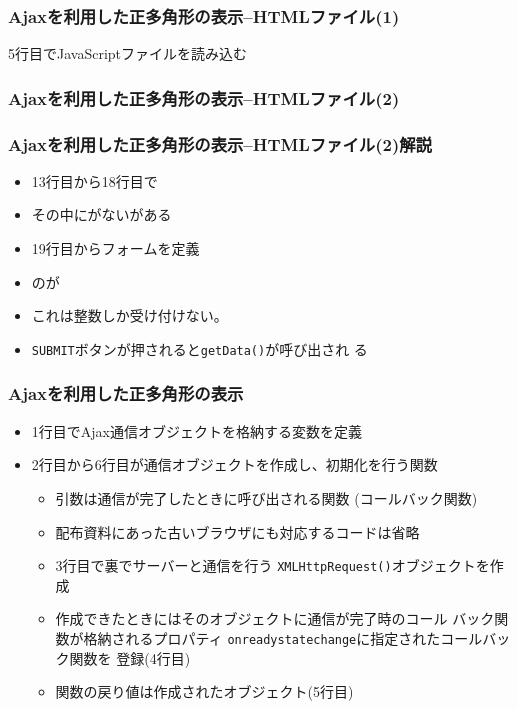 \begin{frame}[containsverbatim]
 \frametitle{Ajaxを利用した正多角形の表示--HTMLファイル(1)}
 5行目でJavaScriptファイルを読み込む
\end{frame}
\begin{frame}[containsverbatim]
 \frametitle{Ajaxを利用した正多角形の表示--HTMLファイル(2)}
\end{frame}
\begin{frame}[containsverbatim]
 \frametitle{Ajaxを利用した正多角形の表示--HTMLファイル(2)解説}
 \begin{itemize}
  \item 13行目から18行目で     
  \item その中にがないがある
  \item 19行目からフォームを定義
	\item {}のが
	\item これは整数しか受け付けない。
  \item \texttt{SUBMIT}ボタンが押されると\texttt{getData()}が呼び出され
        る
 \end{itemize}
\end{frame}
\begin{frame}[containsverbatim]
 \frametitle{Ajaxを利用した正多角形の表示}
 \begin{itemize}
  \item 1行目でAjax通信オブジェクトを格納する変数を定義
  \item 2行目から6行目が通信オブジェクトを作成し、初期化を行う関数
        \begin{itemize}
         \item 引数は通信が完了したときに呼び出される関数
               (コールバック関数)
         \item 配布資料にあった古いブラウザにも対応するコードは省略 
         \item 3行目で裏でサーバーと通信を行う
               \texttt{XMLHttpRequest()}オブジェクトを作成
         \item 作成できたときにはそのオブジェクトに通信が完了時のコール
               バック関数が格納されるプロパティ
               \texttt{onreadystatechange}に指定されたコールバック関数を
               登録(4行目)
         \item 関数の戻り値は作成されたオブジェクト(5行目)
        \end{itemize}
 \end{itemize}
\end{frame}
